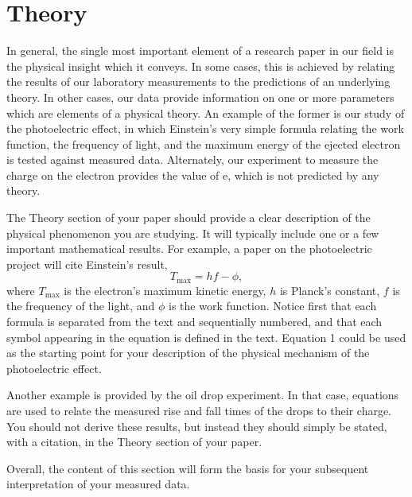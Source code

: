 \section{Theory}\label{sec:theory}

In general, the single most important element of a research paper in our field is the physical insight which it conveys. In some cases, this is achieved by relating the results of our laboratory measurements to the predictions of an underlying theory. In other cases, our data provide information on one or more parameters which are elements of a physical theory. An example of the former is our study of the photoelectric effect, in which Einstein's very simple formula relating the work function, the frequency of light, and the maximum energy of the ejected electron is tested against measured data. Alternately, our experiment to measure the charge on the electron provides the value of e, which is not predicted by any theory.

The Theory section of your paper should provide a clear description of the physical phenomenon you are studying. It will typically include one or a few important mathematical results. For example, a paper on the photoelectric project will cite Einstein's result,\cite{Marg_88}
\begin{equation}\label{eq:photoelectric_energy}
    T_{\text{max}}=hf-\phi,
\end{equation}
where $T_{\text{max}}$ is the electron's maximum kinetic energy, $h$ is Planck's constant, $f$ is the frequency of the light, and $\phi$ is the work function. Notice first that each formula is separated from the text and sequentially numbered, and that each symbol appearing in the equation is defined in the text. Equation 1 could be used as the starting point for your description of the physical mechanism of the photoelectric effect.

Another example is provided by the oil drop experiment. In that case, equations are used to relate the measured rise and fall times of the drops to their charge. You should not derive these results, but instead they should simply be stated, with a citation, in the Theory section of your paper.

Overall, the content of this section will form the basis for your subsequent interpretation of your measured data.